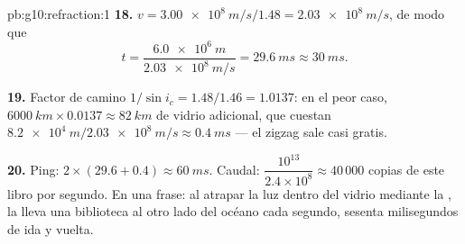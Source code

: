\begin{solution}{pb:g10:refraction:1}
\textbf{18.} $v = \qty{3.00e8}{m/s}/1.48 = \qty{2.03e8}{m/s}$, de modo
que
\[
t = \frac{\qty{6.0e6}{m}}{\qty{2.03e8}{m/s}} = \qty{29.6}{ms} \approx
\qty{30}{ms}.
\]

\textbf{19.} Factor de camino $1/\sin i_c = 1.48/1.46 = 1.0137$: en el
peor caso, $\qty{6000}{km} \times 0.0137 \approx \qty{82}{km}$ de
vidrio adicional, que cuestan
$\qty{8.2e4}{m} / \qty{2.03e8}{m/s} \approx \qty{0.4}{ms}$ --- el zigzag
sale casi gratis.

\textbf{20.} Ping: $2 \times (29.6 + 0.4) \approx \qty{60}{ms}$. Caudal:
$\dfrac{10^{13}}{2.4 \times 10^8} \approx 40\,000$ copias de este libro
por segundo. En una frase: al atrapar la luz dentro del vidrio mediante
la , la  lleva una biblioteca al otro
lado del océano cada segundo, sesenta milisegundos de ida y vuelta.
\end{solution}
